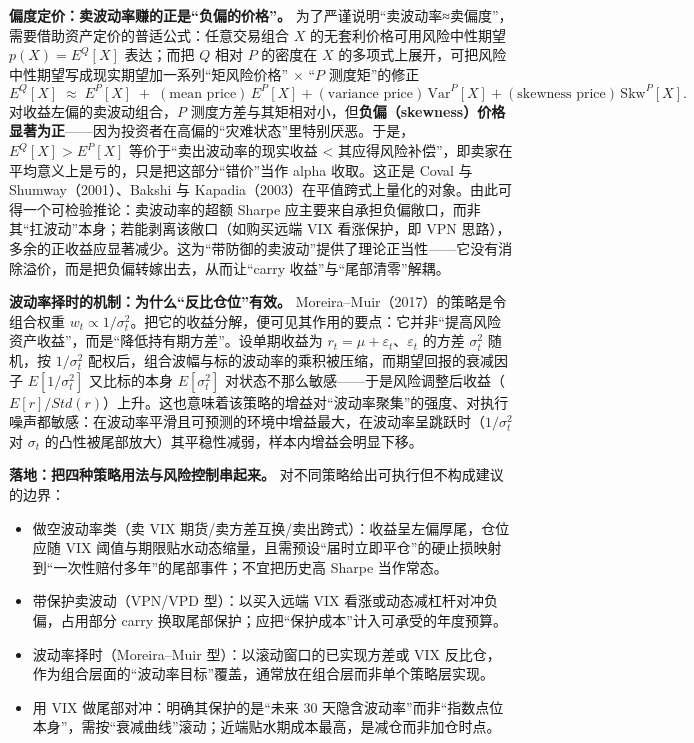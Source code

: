 \documentclass[11pt,a4paper]{ctexart}
\begin{document}
\textbf{偏度定价：卖波动率赚的正是“负偏的价格”。} 为了严谨说明“卖波动率≈卖偏度”，需要借助资产定价的普适公式：任意交易组合 $X$ 的无套利价格可用风险中性期望 $p(X)=E^Q[X]$ 表达；而把 $Q$ 相对 $P$ 的密度在 $X$ 的多项式上展开，可把风险中性期望写成现实期望加一系列“矩风险价格” $\times$ “$P$ 测度矩”的修正
\[
E^Q[X]\;\approx\;E^P[X]\;+\;(\text{mean price})\,E^P[X]+(\text{variance price})\,\mathrm{Var}^P[X]+(\text{skewness price})\,\mathrm{Skw}^P[X].
\]
对收益左偏的卖波动组合，$P$ 测度方差与其矩相对小，但\textbf{负偏（skewness）价格显著为正}——因为投资者在高偏的“灾难状态”里特别厌恶。于是，$E^Q[X]>E^P[X]$ 等价于“卖出波动率的现实收益 < 其应得风险补偿”，即卖家在平均意义上是亏的，只是把这部分“错价”当作 alpha 收取。这正是 Coval 与 Shumway（2001）、Bakshi 与 Kapadia（2003）在平值跨式上量化的对象。由此可得一个可检验推论：卖波动率的超额 Sharpe 应主要来自承担负偏敞口，而非其“扛波动”本身；若能剥离该敞口（如购买远端 VIX 看涨保护，即 VPN 思路），多余的正收益应显著减少。这为“带防御的卖波动”提供了理论正当性——它没有消除溢价，而是把负偏转嫁出去，从而让“carry 收益”与“尾部清零”解耦。

\textbf{波动率择时的机制：为什么“反比仓位”有效。} Moreira–Muir（2017）的策略是令组合权重 $w_t\propto 1/\sigma_t^2$。把它的收益分解，便可见其作用的要点：它并非“提高风险资产收益”，而是“降低持有期方差”。设单期收益为 $r_t=\mu+\varepsilon_t$、$\varepsilon_t$ 的方差 $\sigma_t^2$ 随机，按 $1/\sigma_t^2$ 配权后，组合波幅与标的波动率的乘积被压缩，而期望回报的衰减因子 $E[1/\sigma_t^2]$ 又比标的本身 $E[\sigma_t^2]$ 对状态不那么敏感——于是风险调整后收益（$E[r]/Std(r)$）上升。这也意味着该策略的增益对“波动率聚集”的强度、对执行噪声都敏感：在波动率平滑且可预测的环境中增益最大，在波动率呈跳跃时（$1/\sigma_t^2$ 对 $\sigma_t$ 的凸性被尾部放大）其平稳性减弱，样本内增益会明显下移。

\textbf{落地：把四种策略用法与风险控制串起来。} 对不同策略给出可执行但不构成建议的边界：
\begin{itemize}[leftmargin=2em,itemsep=2pt]
  \item 做空波动率类（卖 VIX 期货/卖方差互换/卖出跨式）：收益呈左偏厚尾，仓位应随 VIX 阈值与期限贴水动态缩量，且需预设“届时立即平仓”的硬止损映射到“一次性赔付多年”的尾部事件；不宜把历史高 Sharpe 当作常态。
  \item 带保护卖波动（VPN/VPD 型）：以买入远端 VIX 看涨或动态减杠杆对冲负偏，占用部分 carry 换取尾部保护；应把“保护成本”计入可承受的年度预算。
  \item 波动率择时（Moreira–Muir 型）：以滚动窗口的已实现方差或 VIX 反比仓，作为组合层面的“波动率目标”覆盖，通常放在组合层而非单个策略层实现。
  \item 用 VIX 做尾部对冲：明确其保护的是“未来 30 天隐含波动率”而非“指数点位本身”，需按“衰减曲线”滚动；近端贴水期成本最高，是减仓而非加仓时点。
\end{itemize}
\end{document}
